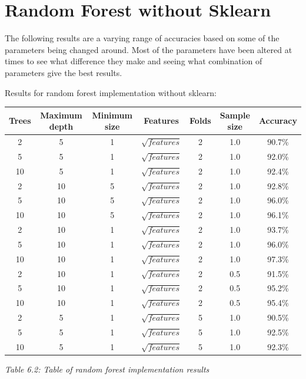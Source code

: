 \section{Random Forest without Sklearn}
The following results are a varying range of accuracies based on some of the parameters being changed around. Most of the parameters have been altered at times to see what difference they make and seeing what combination of parameters give the best results.

Results for random forest implementation without sklearn:
\begin{center}
\begin{tabular}{|c | c | c | c | c | c | c |}
\hline
Trees & Maximum depth & Minimum size & Features & Folds & Sample size & Accuracy \\
\hline
2 & 5 & 1 & $\sqrt{features}$ & 2 & 1.0 & 90.7\% \\
\hline
5 & 5 & 1 & $\sqrt{features}$ & 2 & 1.0 & 92.0\% \\
\hline
10 & 5 & 1 & $\sqrt{features}$ & 2 & 1.0 & 92.4\% \\
\hline
2 & 10 & 5 & $\sqrt{features}$ & 2 & 1.0 & 92.8\% \\
\hline
5 & 10 & 5 & $\sqrt{features}$ & 2 & 1.0 & 96.0\% \\
\hline
10 & 10 & 5 & $\sqrt{features}$ & 2 & 1.0 & 96.1\% \\
\hline
2 & 10 & 1 & $\sqrt{features}$ & 2 & 1.0 & 93.7\% \\
\hline
5 & 10 & 1 & $\sqrt{features}$ & 2 & 1.0 & 96.0\% \\
\hline
10 & 10 & 1 & $\sqrt{features}$ & 2 & 1.0 & 97.3\% \\
\hline
2 & 10 & 1 & $\sqrt{features}$ & 2 & 0.5 & 91.5\% \\
\hline
5 & 10 & 1 & $\sqrt{features}$ & 2 & 0.5 & 95.2\% \\
\hline
10 & 10 & 1 & $\sqrt{features}$ & 2 & 0.5 & 95.4\% \\
\hline
2 & 5 & 1 & $\sqrt{features}$ & 5 & 1.0 & 90.5\% \\
\hline
5 & 5 & 1 & $\sqrt{features}$ & 5 & 1.0 & 92.5\% \\
\hline
10 & 5 & 1 & $\sqrt{features}$ & 5 & 1.0 & 92.3\% \\
\hline

\end{tabular}
\textit{Table 6.2: Table of random forest implementation results}
\end{center}

